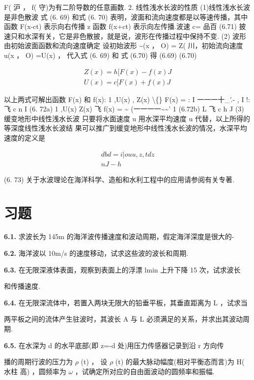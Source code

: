 F( 沪 ， f( 守)为有二阶导数的任意画数. 2. 线性浅水长波的性质 (1)线性浅水长波是非色散波 式 (6. 69) 和式 (6. 70) 表明，波面和流向速度都是以等速传播，其中函数 F(x-ct) 表示向右传播 z 函数 f(x+ct) 表示向左传播.波速 c= 品百 (6.71) 披速只和水深有关，它是非色散披，就是说，波形在传播过程中保持不变. (2) 波形由初始波面函数和流向速度确定 设初始波形 \textasciitilde{}(x ， O) = Z( 川，初始流向速度 u(x ， O) =U(x) ， 代入式 (6. 69) 和 式 (6.70) 得 (6.69) (6.70)

\begin{gather*}
Z(x) = h[F(x) - f(x)J\\
U(x) = c[F(x) + f(x)J
\end{gather*}

以上两式可解出函数 F(x) 和 f(x): 1 ,U(x) , Z(x) \textbackslash\{\} F(x) = : I 一一一十\_'.- , I !:飞 c n I (6. 72a) 1 ,U(x) Z(x) 飞 f(x) = \textasciitilde{} (一一一一\textasciitilde{}\textasciitilde{}' 1 (6.72b) L 飞 c h J (3) 缓变地形中线性浅水长波 只要将水面速度 u 用水深平均速度 u 代替，以上所得的等深度线性浅水长波结 果可以推广到缓变地形中线性浅水长波的情况，水深平均速度的定义是

\begin{gather*}
dbd=i| o uu , z , tdz\\
n J - h
\end{gather*}

(6. 73) 关于水波理论在海洋科学、造船和水利工程中的应用请参阅有关专著.

\section*{习题}

\noindent\textbf{6.1.} 求波长为 145m 的海洋波传播速度和波动周期，假定海洋深度是很大的-

\noindent\textbf{6.2.} 海洋波以 10m/s 的速度移动，试求这些波的波长和周期.

\noindent\textbf{6.3.} 在无限深液体表面，观察到表面上的浮漂 lmin 上升下降 15 次，试求波长

和传播速度.

\noindent\textbf{6.4.} 在无限深流体中，若置入两块无限大的铅垂平板，其垂直距离为 L ，试求当

两平板之间的流体产生驻波时，其波长 A 与 L 必须满足的关系，并求出其波动周期.

\noindent\textbf{6.5.} 在水深为 d 的水平底部(即 z=-d 处)用压力传感器记录到沿 r 方向传

播的周期行波的压力为 $\rho$ (t) ， 设 $\rho$ (t) 的最大脉动幅度(相对平衡态而言)为 H( 水柱 高) ，圆频率为 $\omega$ ，试确定所对应的自由面波动的圆频率和振幅.

